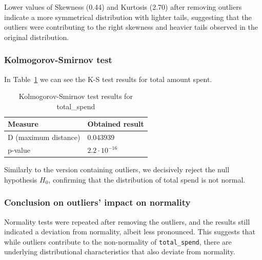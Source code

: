 \documentclass[12pt]{report}
\begin{document}
\noindent Lower values of Skewness (0.44) and Kurtosis (2.70) after removing outliers indicate a more symmetrical distribution with lighter tails, suggesting that the outliers were contributing to the right skewness and heavier tails observed in the original distribution.

\subsubsection{Kolmogorov-Smirnov test}
In Table~\ref{tab:ks_total_spend} we can see the K-S test results for total amount spent.
\begin{table}[H]

    \centering
    \begin{tabular}{|l|l|}
        \hline
        Measure              & Obtained result    \\ \hline
        D (maximum distance) & 0.043939           \\ \hline
        p-value              & \(2.2\cdot10^{-16}\) \\ \hline
    \end{tabular}

    \caption{Kolmogorov-Smirnov test results for total\_spend}\label{tab:ks_total_spend}
\end{table}

\noindent Similarly to the version containing outliers, we decisively reject the null hypothesis \(H_0\), confirming that the distribution of total spend is not normal.

\subsubsection{Conclusion on outliers' impact on normality}
\noindent Normality tests were repeated after removing the outliers, and the results still indicated a deviation from normality, albeit less pronounced. This suggests that while outliers contribute to the non-normality of \texttt{total\_spend}, there are underlying distributional characteristics that also deviate from normality.

\end{document}
